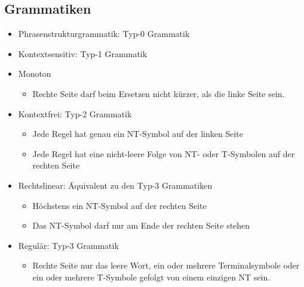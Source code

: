 \documentclass[ngerman]{scrartcl}
\begin{document}
\subsection{Grammatiken}
\begin{itemize}
    \item Phrasenstrukturgrammatik: Typ-0 Grammatik
    \item Kontextsensitiv: Typ-1 Grammatik
    \item Monoton
    \begin{itemize}
        \item Rechte Seite darf beim Ersetzen nicht kürzer, als die linke Seite sein.
    \end{itemize}
    \item Kontextfrei: Typ-2 Grammatik
    \begin{itemize}
        \item Jede Regel hat genau ein NT-Symbol auf der linken Seite
        \item Jede Regel hat eine nicht-leere Folge von NT- oder T-Symbolen auf der rechten Seite
    \end{itemize}
    \item Rechtslinear: Äquivalent zu den Typ-3 Grammatiken 
    \begin{itemize}
        \item Höchstens ein NT-Symbol auf der rechten Seite
        \item Das NT-Symbol darf nur am Ende der rechten Seite stehen
    \end{itemize}
    \item Regulär: Typ-3 Grammatik
    \begin{itemize}
        \item Rechte Seite nur das leere Wort, ein oder mehrere Terminalsymbole oder ein oder mehrere T-Symbole gefolgt von einem einzigen NT sein.
    \end{itemize}
\end{itemize}
\end{document}
